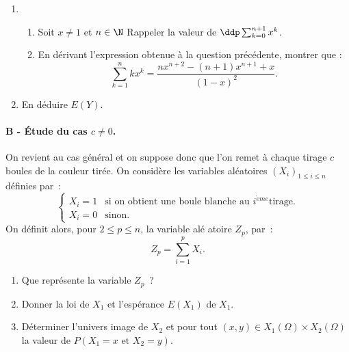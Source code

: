 \documentclass[a4paper, 11pt,reqno]{article}
\begin{document}
\begin{exercice}
\begin{enumerate}
\item \begin{enumerate}
\item Soit $x\neq 1$ et $n\in \N$  Rappeler la valeur de $\ddp \sum_{k=0}^{n+1} x^k $.
 \item En dérivant l'expression obtenue à la question précédente, montrer que : 
\begin{equation*}
\sum_{k=1}^{n}kx^{k}=\frac{nx^{n+2}-(n+1)x^{n+1}+x}{(1-x)^{2}}.
\end{equation*}
\end{enumerate}


\item En d\'{e}duire $E(Y)$.
\end{enumerate}

\paragraph{\small{B - \'Etude du cas $c\neq 0$.}\\}
On revient au cas général et on suppose donc que l'on remet à chaque tirage $c$ boules de la couleur tirée. 
On consid\`{e}re les variables al\'{e}atoires $\left( X_{i}\right)
_{1\leqslant i\leqslant n}$ d\'{e}finies par~: 
\begin{equation*}
\begin{cases}
X_{i}=1 & \text{si on obtient une boule blanche au }i^{\grave{e}me}\text{
tirage.} \\ 
X_{i}=0 & \text{sinon.}%
\end{cases}%
\end{equation*}%
On d\'{e}finit alors, pour $2\leqslant p\leqslant n$, la variable al\'{e}%
atoire $Z_{p}$, par~: 
\begin{equation*}
Z_{p}=\sum_{i=1}^{p}X_{i}.
\end{equation*}

\begin{enumerate}
\item Que repr\'{e}sente la variable $Z_{p}$~?

\item Donner la loi de $X_{1}$ et l'esp\'{e}rance $E(X_{1})$ de $X_{1}$.

\item D\'{e}terminer l'univers image de $X_2$ et pour tout $(x,y)\in X_1(\Omega) \times X_2(\Omega)$ la valeur de $P(X_1=x \text{ et } X_2 =y)$. 


\end{enumerate}
\end{exercice}
\end{document}
